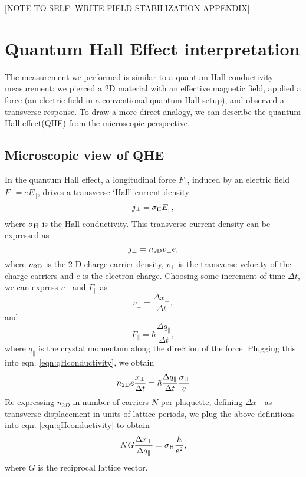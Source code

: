 [NOTE TO SELF: WRITE FIELD STABILIZATION APPENDIX]

\section{Quantum Hall Effect interpretation}\label{sec:qh}

The measurement we performed is similar to a quantum Hall conductivity measurement: we pierced a 2D material with an effective magnetic field, applied a force (an electric field in a conventional quantum Hall setup), and observed a transverse response. To draw a more direct analogy, we can describe the quantum Hall effect(QHE) from the microscopic perspective. 

\subsection{Microscopic view of QHE}
In the quantum Hall effect, a longitudinal force $F_{\parallel}$, induced by an electric field $F_{\parallel}=e E_{\parallel}$, drives a transverse \lq{Hall}\rq{} current density 
\begin{equation}
j_{\perp} = \sigma_{\rm{H}} E_{\parallel},
\label{eqn:qHconductivity}
\end{equation}
where $\sigma_{\rm{H}}$ is the Hall conductivity.  This transverse current density can be expressed as 
\begin{equation}
j_{\perp}=n_{2\rm{D}}v_{\perp}e,
\end{equation}
where $n_{2\rm{D}}$ is the 2-D charge carrier density, $v_{\perp}$ is the transverse velocity of the charge carriers and $e$ is the electron charge. Choosing some increment of time $\Delta t$, we can express $v_{\perp}$ and $F_{\parallel}$ as 
\begin{equation}
v_{\perp}=\frac{\Delta x_{\perp}}{\Delta t},
\end{equation}
and 
\begin{equation}
F_{\parallel} = \hbar \frac{\Delta q_{\parallel}}{\Delta t},
\end{equation}
where $q_{\parallel}$ is the crystal momentum along the direction of the force. Plugging this into eqn. \ref{eqn:qHconductivity}, we obtain
\begin{equation}
n_{2{\rm D}} e  \frac{x_{\perp}}{\Delta t} = \hbar \frac{\Delta q_{\parallel}}{\Delta t} \frac{\sigma_{\rm H}}{e}
\end{equation}
 Re-expressing $n_{2D}$ in number of carriers $N$ per plaquette, defining $\Delta x_{\perp}$ as transverse displacement in units of lattice periods, we plug the above definitions into eqn. \ref{eqn:qHconductivity} to obtain
\begin{equation}
N G\frac{\Delta x_{\perp}}{\Delta q_{\parallel}}=\sigma_{\rm{H}} \frac{h}{e^2},
\label{eqn:qHconductivityMicro}
\end{equation}
where $G$ is the reciprocal lattice vector. 

